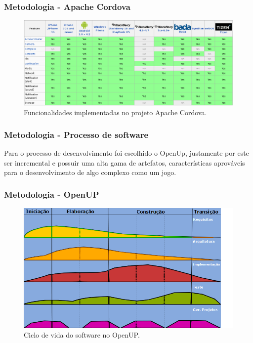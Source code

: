 \documentclass{beamer}
\begin{document}
\begin{frame}
\frametitle{Metodologia - Apache Cordova }

\begin{figure}[!htbp]
    \begin{center}
        \includegraphics[width=\textwidth]{cordovaFeatures.jpg}
               \caption{Funcionalidades implementadas no projeto Apache Cordova.\label{fig:Cordova}}
    \end{center}
\end{figure}

\end{frame}

\begin{frame}
\frametitle{Metodologia - Processo de software }

Para o  processo de desenvolvimento foi escolhido o OpenUp, justamente por este ser incremental e possuir uma alta gama de artefatos, características aprováveis para o desenvolvimento de algo complexo como um jogo.
\end{frame}

\begin{frame}
\frametitle{Metodologia  - OpenUP}

\begin{figure}[!htbp]
    \begin{center}
        \includegraphics[width=\textwidth]{openupcicle.png}
               \caption{Ciclo de vida do software no OpenUP.\label{fig:OpenUp}}
    \end{center}
\end{figure}

\end{frame}
\end{document}
